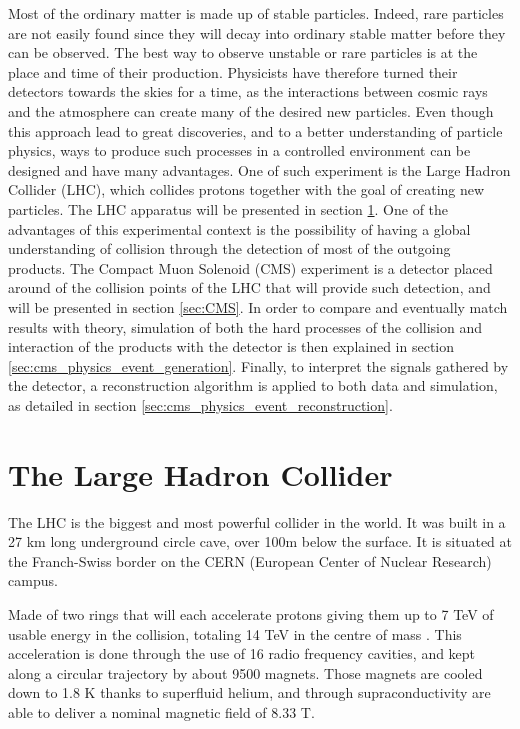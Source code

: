
Most of the ordinary matter is made up of stable particles. Indeed, rare particles are not easily found since they will decay into ordinary stable matter before they can be observed. The best way to observe unstable or rare particles is at the place and time of their production. Physicists have therefore turned their detectors towards the skies for a time, as the interactions between cosmic rays and the atmosphere can create many of the desired new particles. Even though this approach lead to great discoveries, and to a better understanding of particle physics, ways to produce such processes in a controlled environment can be designed and have many advantages. One of such experiment is the Large Hadron Collider (LHC), which collides protons together with the goal of creating new particles. The LHC apparatus will be presented in section \ref{sec:LHC}. One of the advantages of this experimental context is the possibility of having a global understanding of collision through the detection of most of the outgoing products. The Compact Muon Solenoid (CMS) experiment is a detector placed around of the collision points of the LHC that will provide such detection, and will be presented in section \ref{sec:CMS}. In order to compare and eventually match results with theory, simulation of both the hard processes of the collision and interaction of the products with the detector is then explained in section \ref{sec:cms_physics_event_generation}. Finally, to interpret the signals gathered by the detector, a reconstruction algorithm is applied to both data and simulation, as detailed in section \ref{sec:cms_physics_event_reconstruction}.

\section{The Large Hadron Collider}
\label{sec:LHC}

The LHC is the biggest and most powerful collider in the world. It was built in a 27 km long underground circle cave, over 100m below the surface. It is situated at the Franch-Swiss border on the CERN (European Center of Nuclear Research) campus.

Made of two rings that will each accelerate protons giving them up to 7 TeV of usable energy in the collision, totaling 14 TeV in the centre of mass \cite{Brüning:782076,Brüning:815187,Benedikt:823808}. This acceleration is done through the use of 16 radio frequency cavities, and kept along a circular trajectory by about 9500 magnets. Those magnets are cooled down to 1.8 K thanks to superfluid helium, and through supraconductivity are able to deliver a nominal magnetic field of 8.33 T.


